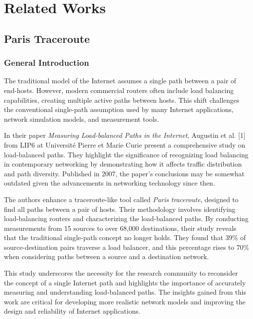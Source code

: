 \documentclass[12pt]{cwru_thesis}
\begin{document}







\chapter{Related Works} \label{chap:related}
\section{Paris Traceroute}

\subsection{General Introduction}
The traditional model of the Internet assumes a single path between a pair of end-hosts. However, modern commercial routers often include load balancing capabilities, creating multiple active paths between hosts. This shift challenges the conventional single-path assumption used by many Internet applications, network simulation models, and measurement tools.

In their paper \textit{Measuring Load-balanced Paths in the Internet}, Augustin et al. [1] from LIP6 at Université Pierre et Marie Curie present a comprehensive study on load-balanced paths. They highlight the significance of recognizing load balancing in contemporary networking by demonstrating how it affects traffic distribution and path diversity. Published in 2007, the paper's conclusions may be somewhat outdated given the advancements in networking technology since then.

The authors enhance a traceroute-like tool called \textit{Paris traceroute}, designed to find all paths between a pair of hosts. Their methodology involves identifying load-balancing routers and characterizing the load-balanced paths. By conducting measurements from 15 sources to over 68,000 destinations, their study reveals that the traditional single-path concept no longer holds. They found that 39\% of source-destination pairs traverse a load balancer, and this percentage rises to 70\% when considering paths between a source and a destination network.

This study underscores the necessity for the research community to reconsider the concept of a single Internet path and highlights the importance of accurately measuring and understanding load-balanced paths. The insights gained from this work are critical for developing more realistic network models and improving the design and reliability of Internet applications.
\end{document}
